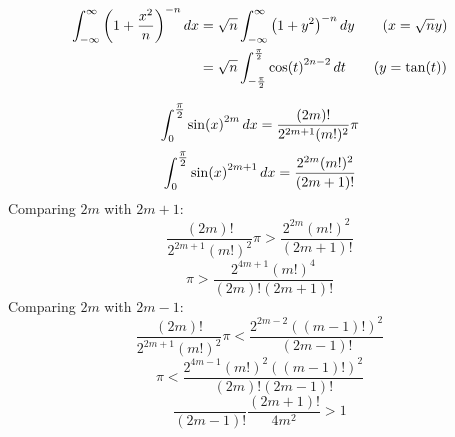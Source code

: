 \documentclass[main.tex]{subfiles}
\begin{document}
\begin{align*}
    \int_{-\infty}^{\infty} \qty(1+\frac{x^2}{n})^{-n} \dx
    &= \sqrt{n}\int_{-\infty}^{\infty} \qty(1+y^2)^{-n} \dy
        \tag{$x=\sqrt{n}y$} \\
    &= \sqrt{n}\int_{-\frac{\pi}{2}}^{\frac{\pi}{2}} \cos(t)^{2n-2} \dt
        \tag{$y=\tan(t)$} \\
\end{align*}


\begin{equation*}
    \int_0^{\tfrac{\pi}{2}} \sin(x)^{2m} \,dx = \frac{(2m)!}{2^{2m+1}(m!)^2}\pi
\end{equation*}
\begin{equation*}
    \int_0^{\tfrac{\pi}{2}} \sin(x)^{2m+1} \,dx = \frac{2^{2m}(m!)^2}{(2m+1)!}
\end{equation*}
Comparing $2m$ with $2m+1$:
\begin{equation*}
    \frac{(2m)!}{2^{2m+1}(m!)^2}\pi > \frac{2^{2m}(m!)^2}{(2m+1)!}
\end{equation*}
\begin{equation*}
    \pi > \frac{2^{4m+1}(m!)^4}{(2m)!(2m+1)!}
\end{equation*}
Comparing $2m$ with $2m-1$:
\begin{equation*}
    \frac{(2m)!}{2^{2m+1}(m!)^2}\pi  < \frac{2^{2m-2}((m-1)!)^2}{(2m-1)!}
\end{equation*}
\begin{equation*}
    \pi < \frac{2^{4m-1}(m!)^2((m-1)!)^2}{(2m)!(2m-1)!}
\end{equation*}
\begin{equation*}
    \frac{}{(2m-1)!}\frac{(2m+1)!}{4m^2} > 1
\end{equation*}
\end{document}
